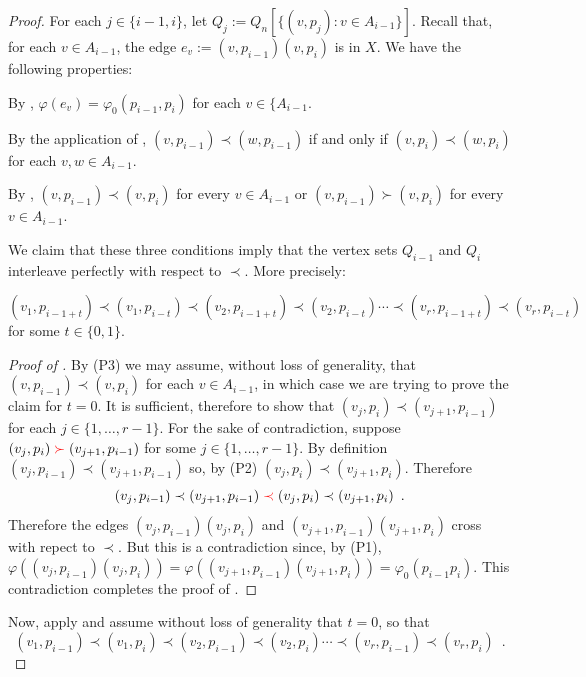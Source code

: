 \documentclass[kpfonts]{patmorin}
\begin{document}
\begin{proof}
    For each $j\in\{i-1,i\}$, let $Q_j:=Q_n[\{(v,p_j):v\in A_{i-1}\}]$.
    Recall that, for each $v\in A_{i-1}$, the edge $e_v:=(v,p_{i-1})(v,p_i)$ is in $X$.  We have the following properties:
    \begin{compactenum}[(P1)]
        \item By , $\varphi(e_v)=\varphi_0(p_{i-1},p_i)$ for each $v\in\{A_{i-1}$.
        \item By the application of , $(v,p_{i-1})\prec (w,p_{i-1})$ if and only if $(v,p_{i})\prec (w,p_{i})$ for each $v,w\in A_{i-1}$.
        \item By , $(v,p_{i-1})\prec (v,p_i)$ for every $v\in A_{i-1}$ or $(v,p_{i-1})\succ (v,p_i)$ for every $v\in A_{i-1}$.
    \end{compactenum}
    We claim that these three conditions imply that the vertex sets $Q_{i-1}$ and $Q_{i}$ interleave perfectly with respect to $\prec$. More precisely:
	\begin{clm} $(v_1,p_{i-1+t})\prec (v_1,p_{i-t}) \prec (v_2,p_{i-1+t}) \prec (v_2,p_{i-t}) \cdots \prec (v_r,p_{i-1+t}) \prec (v_r,p_{i-t})$ for some $t\in\{0,1\}$.
	\end{clm}
	\begin{proof}[Proof of ]
		By (P3) we may assume, without loss of generality, that $(v,p_{i-1})\prec (v,p_i)$ for each $v\in A_{i-1}$, in which case we are trying to prove the claim for $t=0$.  It is sufficient, therefore to show that $(v_j,p_i)\prec (v_{j+1},p_{i-1})$ for each $j\in\{1,\ldots,r-1\}$.  For the sake of contradiction, suppose $(v_j,p_{i}){\color{red}{}\succ{}} (v_{j+1},p_{i-1})$ for some $j\in\{1,\ldots,r-1\}$. By definition $(v_j,p_{i-1})\prec (v_{j+1},p_{i-1})$ so, by (P2)  $(v_{j},p_i) \prec (v_{j+1},p_i)$.  Therefore
		\[
			(v_j,p_{i-1})\prec (v_{j+1},p_{i-1}) {\color{red}{}\prec{}} (v_{j},p_i) \prec
		   (v_{j+1}, p_i) \enspace .
	   	\]
		Therefore the edges $(v_j,p_{i-1})(v_j,p_{i})$ and $(v_{j+1},p_{i-1})(v_{j+1},p_i)$ cross with repect to $\prec$.  But this is a contradiction since, by (P1),  $\varphi((v_j,p_{i-1})(v_j,p_{i})) =\varphi((v_{j+1},p_{i-1})(v_{j+1},p_i))=\varphi_0(p_{i-1}p_i)$.
		This contradiction completes the proof of .
	\end{proof}


	Now, apply  and assume without loss of generality that $t=0$, so that
	\[
		(v_1,p_{i-1})\prec (v_1,p_{i}) \prec (v_2,p_{i-1}) \prec (v_2,p_{i}) \cdots \prec (v_r,p_{i-1}) \prec (v_r,p_{i}) \enspace .
	\]


\end{proof}
\end{document}
